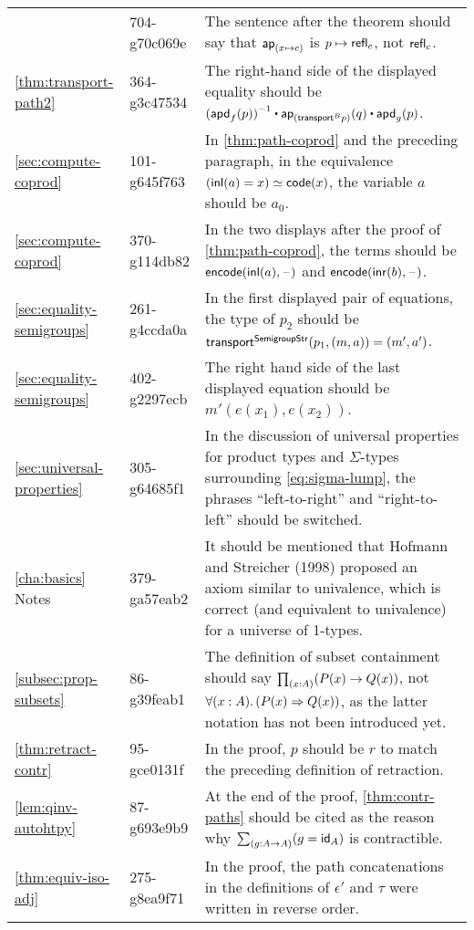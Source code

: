 \documentclass[
%
%
11pt %
]{article}
\begin{document}
\begin{longtable}{llp{10.5cm}}
  & 704-g70c069e
  & The sentence after the theorem should say that $\mathsf{ap}_{(x \mapsto c)}$ is $p \mapsto\mathsf{refl}_{c}$, not $\mathsf{refl}_{c}$.\\
  \cref{thm:transport-path2}
  & 364-g3c47534
  & The right-hand side of the displayed equality should be $\opp{(\apdfunc{f}(p))} \ct \apfunc{(\transfibf{B}{p})}(q) \ct \apdfunc{g}(p)$.\\
  \cref{sec:compute-coprod}
  & 101-g645f763
  & In \cref{thm:path-coprod} and the preceding paragraph, in the equivalence $({\mathsf{inl}}(a)=x) \simeq \mathsf{code}(x)$, the variable $a$ should be $a_0$. \\
  \cref{sec:compute-coprod}
  & 370-g114db82
  & In the two displays after the proof of \cref{thm:path-coprod}, the terms should be $\mathsf{encode}({\mathsf{inl}}(a), {\mathord{\hspace{1pt}\text{--}\hspace{1pt}}})$ and $\mathsf{encode}({\mathsf{inr}}(b), {\mathord{\hspace{1pt}\text{--}\hspace{1pt}}})$.\\
  \cref{sec:equality-semigroups}
  & 261-g4ccda0a
  & In the first displayed pair of equations, the type of $p_2$ should be $\mathsf{transport}^{\mathsf{SemigroupStr}}(p_1,(m,a)) = {(m',a')}$.\\
  \cref{sec:equality-semigroups}
  & 402-g2297ecb
  & The right hand side of the last displayed equation should be $m'(e(x_1),e(x_2))$.\\
  \cref{sec:universal-properties}
  & 305-g64685f1
  & In the discussion of universal properties for product types and $\Sigma$-types surrounding \cref{eq:sigma-lump}, the phrases ``left-to-right'' and ``right-to-left'' should be switched.\\
  \cref{cha:basics} Notes
  & 379-ga57eab2
  & It should be mentioned that Hofmann and Streicher (1998) proposed an axiom similar to univalence, which is correct (and equivalent to univalence) for a universe of 1-types.\\
  \cref{subsec:prop-subsets}
  & 86-g39feab1
  & The definition of subset containment should say $\prd{x:A}(P(x)\rightarrow Q(x))$, not $\fall{x:A}(P(x)\Rightarrow Q(x))$, as the latter notation has not been introduced yet.\\
  \cref{thm:retract-contr}
  & 95-gce0131f
  & In the proof, $p$ should be $r$ to match the preceding definition of retraction.\\
  \cref{lem:qinv-autohtpy}
  & 87-g693e9b9
  & At the end of the proof, \cref{thm:contr-paths} should be cited as the reason why $\sm{g:A\to A} (g = \idfunc[A])$ is contractible.\\
  \cref{thm:equiv-iso-adj}
  & 275-g8ea9f71
  & In the proof, the path concatenations in the definitions of $\epsilon'$ and $\tau$ were written in reverse order.\\

\end{longtable}
\end{document}
